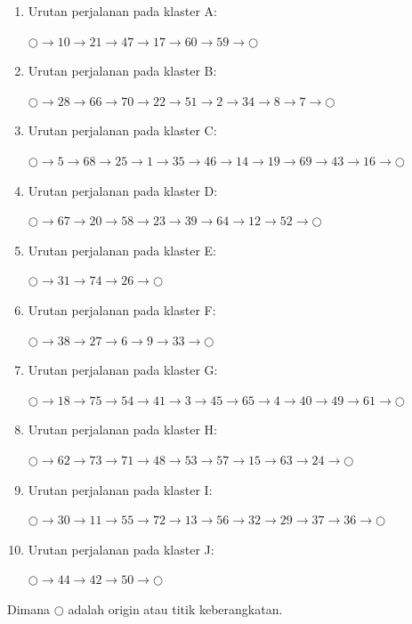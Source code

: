 \begin{enumerate}
\item Urutan perjalanan pada klaster A:

$\bigcirc \to 10 \to 21 \to 47 \to 17 \to 60 \to 59 \to \bigcirc$

\item Urutan perjalanan pada klaster B:

$\bigcirc \to 28 \to 66 \to 70 \to 22 \to 51 \to 2 \to 34 \to 8 \to 7 \to \bigcirc$

\item Urutan perjalanan pada klaster C:

$\bigcirc \to 5 \to 68 \to 25 \to 1 \to 35 \to 46 \to 14 \to 19 \to 69 \to 43 \to 16 \to \bigcirc$

\item Urutan perjalanan pada klaster D:

$\bigcirc \to 67 \to 20 \to 58 \to 23 \to 39 \to 64 \to 12 \to 52 \to \bigcirc$

\item Urutan perjalanan pada klaster E:

$\bigcirc \to 31 \to 74 \to 26 \to \bigcirc$

\item Urutan perjalanan pada klaster F:

$\bigcirc \to 38 \to 27 \to 6 \to 9 \to 33 \to \bigcirc$

\item Urutan perjalanan pada klaster G:

$\bigcirc \to 18 \to 75 \to 54 \to 41 \to 3 \to 45 \to 65 \to 4 \to 40 \to 49 \to 61 \to \bigcirc$

\item Urutan perjalanan pada klaster H:

$\bigcirc \to 62 \to 73 \to 71 \to 48 \to 53 \to 57 \to 15 \to 63 \to 24 \to \bigcirc$

\item Urutan perjalanan pada klaster I:

$\bigcirc \to 30 \to 11 \to 55 \to 72 \to 13 \to 56 \to 32 \to 29 \to 37 \to 36 \to \bigcirc$

\item Urutan perjalanan pada klaster J:

$\bigcirc \to 44 \to 42 \to 50 \to \bigcirc$

\end{enumerate}

\noindent Dimana $\bigcirc$ adalah origin atau titik keberangkatan.

